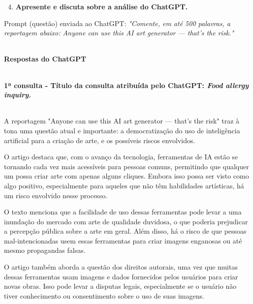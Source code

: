 \begin{enumerate}\setcounter{enumi}{3}\bfseries
    \item  \textbf{Apresente e discuta sobre a análise do ChatGPT.}
\end{enumerate}


Prompt  (questão) enviada ao ChatGPT: 
\textit{"Comente, em até 500 palavras, a reportagem abaixo: Anyone can use this AI art generator — that's the risk."}

~\\ 

\textbf{Respostas do ChatGPT}

~\\ 

\textbf{1ª consulta - Título da consulta atribuída pelo ChatGPT: \textit{Food allergy inquiry.}}

~\\ 

A reportagem "Anyone can use this AI art generator — that's the risk" traz à tona uma questão atual e importante: 
a democratização do uso de inteligência artificial para a criação de arte, e os possíveis riscos envolvidos.

O artigo destaca que, com o avanço da tecnologia, ferramentas de IA estão se tornando cada vez mais
acessíveis para pessoas comuns, permitindo que qualquer um possa criar arte com apenas alguns cliques.
Embora isso possa ser visto como algo positivo, especialmente para aqueles que não têm habilidades artísticas,
há um risco envolvido nesse processo.

O texto menciona que a facilidade de uso dessas ferramentas pode levar a uma inundação do mercado com 
arte de qualidade duvidosa, o que poderia prejudicar a percepção pública sobre a arte em geral. 
Além disso, há o risco de que pessoas mal-intencionadas usem essas ferramentas para criar imagens 
enganosas ou até mesmo propagandas falsas.

O artigo também aborda a questão dos direitos autorais, uma vez que muitas dessas ferramentas usam imagens e 
dados fornecidos pelos usuários para criar novas obras. Isso pode levar a disputas legais, 
especialmente se o usuário não tiver conhecimento ou consentimento sobre o uso de suas imagens.

